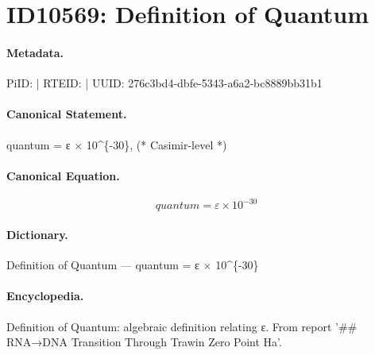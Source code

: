 \section*{ID10569: Definition of Quantum}
\paragraph{Metadata.}
PiID:  | RTEID:  | UUID: 276c3bd4-dbfe-5343-a6a2-bc8889bb31b1

\paragraph{Canonical Statement.}
quantum = ε × 10\textasciicircum{}\{-30\}, (* Casimir-level *)

\paragraph{Canonical Equation.}
\[
quantum = ε × 10^{-30}
\]

\paragraph{Dictionary.}
Definition of Quantum — quantum = ε × 10\textasciicircum{}\{-30\}

\paragraph{Encyclopedia.}
Definition of Quantum: algebraic definition relating ε. From report '\#\# RNA→DNA Transition Through Trawin Zero Point Ha'.
